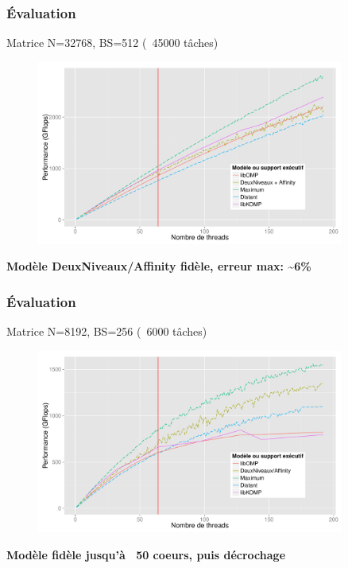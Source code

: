 \documentclass[xcolor={usenames,dvipsnames,svgnames,table}, aspectratio=43]{beamer}
\begin{document}
\begin{frame}
  \frametitle{Évaluation}
  Matrice N=32768, BS=512 (~45000 tâches)
  \begin{figure}
    \includegraphics[width=0.9\textwidth]{graph/simu_affinity_runtime_idchire.pdf}%
  \end{figure}

  \textbf{Modèle DeuxNiveaux/Affinity fidèle, erreur max: \textasciitilde6\%}

\end{frame}

\begin{frame}
  \frametitle{Évaluation}
  Matrice N=8192, BS=256 (~6000 tâches)
  \begin{figure}
    \includegraphics[width=0.9\textwidth]{graph/simu_affinity_8k_runtime_idchire.pdf}%
  \end{figure}

  \textbf{Modèle fidèle jusqu'à ~50 coeurs, puis décrochage}

\end{frame}
\end{document}
